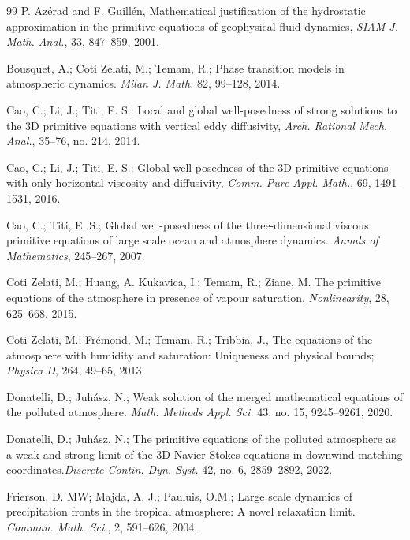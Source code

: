 \documentclass[11pt, a4paper, article,reqno,]{amsart}
\theoremstyle{remark}
\numberwithin{equation}{section}
\begin{document}
\begin{thebibliography}{99}
 P. Az\'erad and F. Guill\'en, Mathematical justification of the hydrostatic approximation in the primitive equations of geophysical fluid dynamics, \textit{SIAM J. Math. Anal.}, 33, 847--859, 2001.

Bousquet, A.; Coti Zelati, M.; Temam, R.;
Phase transition models in atmospheric dynamics. \textit{Milan J. Math.} 82, 99--128, 2014.


 Cao, C.; Li, J.; Titi, E. S.: Local and global well-posedness of strong solutions to the 3D primitive equations with vertical eddy diffusivity, \textit{Arch. Rational Mech. Anal.}, 35--76, no. 214, 2014.

Cao, C.; Li, J.; Titi, E. S.: Global well-posedness of the 3D primitive equations with only horizontal viscosity and diffusivity, \textit{Comm. Pure Appl. Math.}, 69, 1491--1531, 2016.


Cao, C.; Titi, E. S.; Global well-posedness of the three-dimensional viscous primitive equations of large scale ocean and atmosphere dynamics. \textit{Annals of Mathematics}, 245--267, 2007.






 Coti Zelati, M.; Huang, A. Kukavica, I.; Temam, R.; Ziane, M. The primitive equations of the atmosphere in presence of vapour saturation, \textit{Nonlinearity},  28, 625--668. 2015. 

 Coti Zelati, M.; Fr\'emond, M.; Temam, R.; Tribbia, J., The equations of the atmosphere with humidity and saturation: Uniqueness and physical bounds; \textit{Physica D}, 264,   49--65, 2013.

 Donatelli, D.; Juh\'asz, N.; 
Weak solution of the merged mathematical equations of the polluted atmosphere. \textit{Math. Methods Appl. Sci.} 43, no. 15, 9245--9261, 2020.


 Donatelli, D.; Juh\'asz, N.; The primitive equations of the polluted atmosphere as a weak and strong limit of the 3D Navier-Stokes equations in downwind-matching coordinates.\textit{Discrete Contin. Dyn. Syst.} 42, no. 6, 2859--2892, 2022.


Frierson, D. MW; Majda, A. J.; Pauluis, O.M.; Large scale dynamics of precipitation fronts in the tropical atmosphere: A novel relaxation limit. \textit{Commun. Math. Sci.}, 2, 591--626, 2004.






\end{thebibliography}
\end{document}
